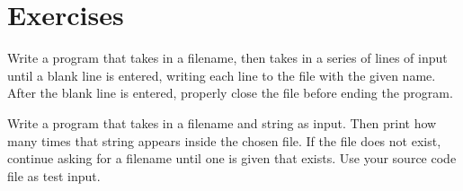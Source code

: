 \documentclass[11pt]{cselabheader}
\begin{document}
\pagebreak
\section{Exercises}
\label{sec:ex}

\begin{ex}[save.py] Write a program that takes in a filename, then takes in
  a series of lines of input until a blank line is entered, writing each line to
  the file with the given name. After the blank line is entered, properly close
  the file before ending the program.  
\end{ex}

\begin{ex} Write a program that
  takes in a filename and string as input. Then print how many times that string
  appears inside the chosen file. If the file does not exist, continue asking
  for a filename until one is given that exists. Use your source code file as
  test input.
\end{ex}
\end{document}
